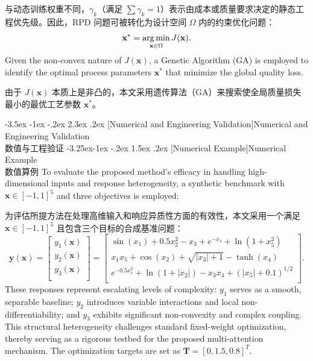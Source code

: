 \documentclass[11pt]{article}
\makeatletter
\renewcommand\section{\@startsection {section}{1}{\z@}%
                                       {-3.5ex \@plus -1ex \@minus -.2ex}%
                                       {2.3ex \@plus.2ex}%
                                       {\normalfont\fontfamily{phv}\fontsize{16}{19}\bfseries}}
\renewcommand\subsection{\@startsection{subsection}{2}{\z@}%
                                         {-3.25ex\@plus -1ex \@minus -.2ex}%
                                         {1.5ex \@plus .2ex}%
                                         {\normalfont\fontfamily{phv}\fontsize{14}{17}\bfseries}}
\newcommand{\bisection}[2]{\section[#1]{#1\protect\\#2}}
\newcommand{\bisubsection}[2]{\subsection[#1]{#1\protect\\#2}}
\makeatother
\begin{document}
与动态训练权重不同，$\gamma_{k}$（满足 $\sum\gamma_{k}=1$）表示由成本或质量要求决定的静态工程优先级。因此，RPD 问题可被转化为设计空间 $\Omega$ 内的约束优化问题：
\begin{equation}
	{{\bf{x}}^*} = \mathop {\arg \min }\limits_{{\bf{x}} \in \Omega } J({\bf{x}}).
\end{equation}
Given the non-convex nature of $J(\mathbf{x})$, a Genetic Algorithm (GA) is employed to identify the optimal process parameters $\mathbf{x}^{*}$ that minimize the global quality loss.

由于 $J(\mathbf{x})$ 本质上是非凸的，本文采用遗传算法（GA）来搜索使全局质量损失最小的最优工艺参数 $\mathbf{x}^{*}$。

\bisection{Numerical and Engineering Validation}{数值与工程验证} \label{s:sec4}
\bisubsection{Numerical Example}{数值算例} \label{s:sec4.1}
To evaluate the proposed method's efficacy in handling high-dimensional inputs and response heterogeneity, a synthetic benchmark with $\mathbf{x} \in [-1, 1]^5$ and three objectives is employed:

为评估所提方法在处理高维输入和响应异质性方面的有效性，本文采用一个满足 $\mathbf{x} \in [-1, 1]^5$ 且包含三个目标的合成基准问题：
\begin{equation}
	\mathbf{y}(\mathbf{x})=\left[ \begin{matrix}
		{{y}_{1}}(\mathbf{x})  \\
		{{y}_{2}}(\mathbf{x})  \\
		{{y}_{3}}(\mathbf{x})  \\
	\end{matrix} \right]=\left[ \begin{matrix}
		\sin ({{x}_{1}})+0.5x_{2}^{2}-{{x}_{3}}+{{e}^{-{{x}_{4}}}}+\ln (1+x_{5}^{2})  \\
		{{x}_{1}}{{x}_{5}}+\cos ({{x}_{2}})+\sqrt{|{{x}_{3}}|+1}-\tanh ({{x}_{4}})  \\
		{{e}^{-0.5x_{1}^{2}}}+\ln (1+|{{x}_{2}}|)-{{x}_{3}}{{x}_{4}}+{{(|{{x}_{5}}|+0.1)}^{1/2}}  \\
	\end{matrix} \right].
\end{equation}
These responses represent escalating levels of complexity: $y_1$ serves as a smooth, separable baseline; $y_2$ introduces variable interactions and local non-differentiability; and $y_3$ exhibits significant non-convexity and complex coupling. This structural heterogeneity challenges standard fixed-weight optimization, thereby serving as a rigorous testbed for the proposed multi-attention mechanism. The optimization targets are set as $\mathbf{T}=[0, 1.5, 0.8]^T$.
\end{document}
